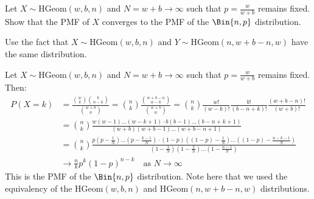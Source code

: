  \begin{exercise}
 	Let $X \sim \text{HGeom}(w, b, n)$ and $N = w + b \to \infty$ such that $p = \frac{w}{w + b}$ remains fixed. Show that the PMF of $X$ converges to the PMF of the $\Bin{n, p}$ distribution.
	\begin{hint}
		Use the fact that $X \sim \text{HGeom}(w, b, n)$ and $Y \sim \text{HGeom}(n, w + b - n, w)$ have the same distribution.
	\end{hint}
	\begin{solution}
		Let $X \sim \text{HGeom}(w, b, n)$ and $N = w + b \to \infty$ such that $p = \frac{w}{w + b}$ remains fixed. Then:
		\begin{align*}
			P(X = k) & = \frac{\binom{w}{k} \binom{b}{n - k}}{\binom{w + b}{n}} = \binom{n}{k} \frac{\binom{w + b - n}{w - k}}{\binom{w + b}{w}} = \binom{n}{k} \frac{w!}{(w - k)!} \frac{b!}{(b - n + k)!} \frac{(w + b - n)!}{(w + b)!} \\
			& = \binom{n}{k} \frac{w(w - 1) \hdots (w - k + 1) \cdot b(b - 1) \hdots (b - n + k + 1)}{(w + b)(w + b - 1) \hdots (w + b - n + 1)} \\
			& = \binom{n}{k} \frac{p \left(p - \frac{1}{N}\right) \hdots \left(p - \frac{k - 1}{N}\right) \cdot (1 - p) \left((1 - p) - \frac{1}{N}\right) \hdots \left((1 - p) - \frac{n - k - 1}{N}\right)}{\left(1 - \frac{1}{N}\right) \left(1 - \frac{2}{N}\right) \hdots \left(1 - \frac{n - 1}{N}\right)} \\
			& \to \frac{n}{k} p^k (1 - p)^{n - k} \quad \text{as } N \to \infty
		\end{align*}
		This is the PMF of the $\Bin{n, p}$ distribution. Note here that we used the equivalency of the $\text{HGeom}(w, b, n)$ and $\text{HGeom}(n, w + b - n, w)$ distributions.
	\end{solution}
\end{exercise}








